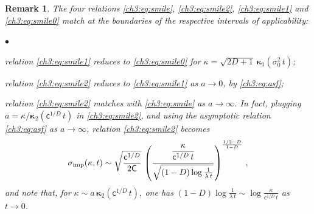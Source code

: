 \documentclass[a4paper,reqno,11pt]{amsart}
\numberwithin{equation}{section}
\newtheorem{remark}[theorem]{Remark}
\newcommand\sfc{\mathsf{c}}
\newcommand\sff{\mathsf{f}}
\newcommand\sfC{\mathsf{C}}
\newenvironment{myitemize}{%
\begin{list}{$\bullet$}%
 	{%
	\setlength{\itemsep}{0.4em}%
	\setlength{\topsep}{0.5em}%
	\setlength\leftmargin{2.45em}%
	\setlength\labelwidth{2.05em}%
	\setlength{\labelsep}{0.4em}%
	}%
	}%
{\end{list}}
\renewenvironment{itemize}{
\begin{myitemize}}%
{\end{myitemize}}
\newcommand\imp{\mathrm{imp}}
\newcommand\bkappa{\boldsymbol{\kappa}}
\begin{document}
\begin{remark}\rm
The four relations \eqref{ch3:eq:smile}, \eqref{ch3:eq:smile2},
\eqref{ch3:eq:smile1} and \eqref{ch3:eq:smile0}
match at the boundaries of the respective intervals of applicability: 
\begin{itemize}
\item relation \eqref{ch3:eq:smile1} reduces to \eqref{ch3:eq:smile0}
for $\kappa = \sqrt{2D+1} \, \bkappa_1(\sigma_0^2 \, t)$;

\item relation \eqref{ch3:eq:smile2} reduces to \eqref{ch3:eq:smile1} as $a \to 0$, by \eqref{ch3:eq:asf};

\item relation \eqref{ch3:eq:smile2} matches with \eqref{ch3:eq:smile} as $a \to \infty$.
In fact, plugging $a = \kappa / \bkappa_2(\sfc^{1/D}\, t)$ in \eqref{ch3:eq:smile2}, and
using the asymptotic relation \eqref{ch3:eq:asf} as $a \to \infty$,
relation \eqref{ch3:eq:smile2} becomes
\begin{equation*}
	\sigma_\imp(\kappa,t) \sim 
	\sqrt{\frac{\sfc^{1/D}}{2 \sfC}} \, %
	\left(\frac{\rule[-1em]{0pt}{1em}\displaystyle\frac{\kappa}{\sfc^{1/D} \, t}}
	{\sqrt{(1-D) \log \frac{1}{\lambda \, t}}}\right)^{\frac{1/2-D}{1-D}} \,,
\end{equation*}
and note that, for $\kappa \sim a \, \bkappa_2(\sfc^{1/D} \, t)$, one has
$(1-D) \log \frac{1}{\lambda \, t} \sim \log \frac{\kappa}{\sfc^{1/D} \, t}$ as $t\to 0$.
\end{itemize}


\end{remark}
\end{document}
